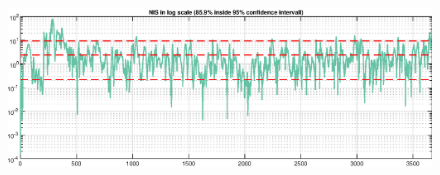 \begin{figure}[!htb]
    \centering
    \includegraphics[width=0.8\linewidth]{figures/ga_2/real_consistency.eps}
    \caption{}
    \label{fig:ga_2_real_consistency}
\end{figure}